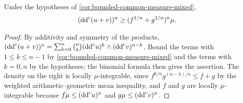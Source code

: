 \begin{corollary}\label{cor:bounded-common-measure-sum}
Under the hypotheses of \cref{cor:bounded-common-measure-mixed},
\[
 (\mathrm{dd}^{\mathrm{c}}(u+v))^n\geq(f^{1/n}+g^{1/n})^n\mu.
\]
\end{corollary}
\begin{proof}
By additivity and symmetry of the products, $(\mathrm{dd}^{\mathrm{c}}(u+v))^n=\sum_{k=0}^n\binom nk(\mathrm{dd}^{\mathrm{c}} u)^k\wedge(\mathrm{dd}^{\mathrm{c}} v)^{n-k}$. Bound the terms with $1\leq k\leq n-1$ by \cref{cor:bounded-common-measure-mixed} and the terms with $k=0,n$ by the hypotheses; the binomial formula then gives the assertion. The density on the right is locally $\mu$-integrable, since $f^{k/n}g^{(n-k)/n}\leq f+g$ by the weighted arithmetic--geometric mean inequality, and $f$ and $g$ are locally $\mu$-integrable because $f\mu\leq(\mathrm{dd}^{\mathrm{c}} u)^n$ and $g\mu\leq(\mathrm{dd}^{\mathrm{c}} v)^n$.
\end{proof}
